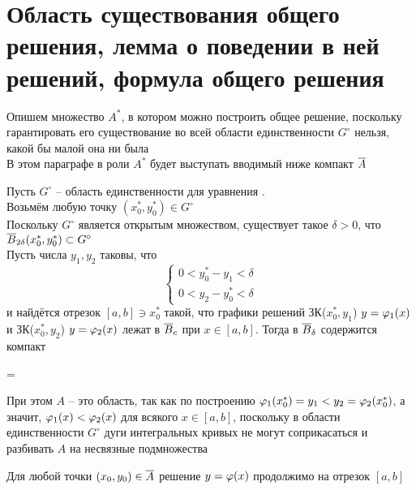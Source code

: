 \section{Область существования общего решения, лемма о поведении в ней решений, формула общего решения}

Опишем множество $ A^* $, в котором можно построить общее решение, поскольку гарантировать его существование во всей области единственности $ G^\circ $ нельзя, какой бы малой она ни была \\
В этом параграфе в роли $ A^* $ будет выступать вводимый ниже компакт $ \ol{A} $

\begin{algorithm}[построения $ \ol{A} $]
    Пусть $ G^\circ $ -- область единственности для уравнения . \\
    Возьмём любую точку $ (x_0^*, y_0^*) \in G^\circ $ \\
    Поскольку $ G^\circ $ является открытым множеством, существует такое $ \delta > 0 $, что $ \overline{B}_{2\delta}(x_0^*, y_0^*) \subset G^\circ $ \\
    Пусть числа $ y_1, y_2 $ таковы, что
    $$
    \begin{cases}
    	0 < y_0^* - y_1 < \delta \\
        0 < y_2 - y_0^* < \delta
    \end{cases} $$
    и найдётся отрезок $ [a, b] \ni x_0^* $ такой, что графики решений ЗК($ x_0^*, y_1 $) $ y = \varphi_1(x) $ и ЗК($ x_0^*, y_2 $) $ y = \varphi_2(x) $ лежат в $ \overline{B}_c $ при $ x \in [a, b] $. Тогда в $ \overline{B}_\delta $ содержится компакт
    \begin{equ}{1.25}
         = 
    \end{equ}
\end{algorithm}

При этом $ A $  -- это область, так как по построению $ \varphi_1(x_0^*) = y_1 < y_2 = \varphi_2(x_0^*) $, а значит, $ \varphi_1(x) < \varphi_2(x) $ для всякого $ x \in [a, b] $, поскольку в области единственности $ G^\circ $ дуги интегральных кривых не могут соприкасаться и разбивать $ A $ на несвязные подмножества

\begin{lemma}\label{lm:comp}
    Для любой точки $ (x_0, y_0) \in \overline{A} $ решение  $ y = \varphi(x) $ продолжимо на отрезок $ [a, b] $
\end{lemma}

